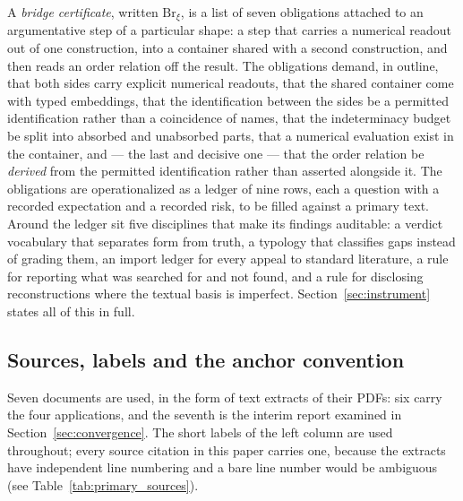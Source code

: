 \documentclass[11pt,a4paper]{article}
\theoremstyle{definition}
\newcommand{\Brxi}{\mathrm{Br}_{\xi}}
\begin{document}
A \emph{bridge certificate}, written $\Brxi$, is a list of seven obligations
attached to an argumentative step of a particular shape: a step that carries a
numerical readout out of one construction, into a container shared with a second
construction, and then reads an order relation off the result. The obligations
demand, in outline, that both sides carry explicit numerical readouts, that the
shared container come with typed embeddings, that the identification between the
sides be a permitted identification rather than a coincidence of names, that the
indeterminacy budget be split into absorbed and unabsorbed parts, that a numerical
evaluation exist in the container, and --- the last and decisive one --- that the
order relation be \emph{derived} from the permitted identification rather than
asserted alongside it. The obligations are operationalized as a ledger of nine
rows, each a question with a recorded expectation and a recorded risk, to be
filled against a primary text. Around the ledger sit five disciplines that make
its findings auditable: a verdict vocabulary that separates form from truth, a
typology that classifies gaps instead of grading them, an import ledger for every
appeal to standard literature, a rule for reporting what was searched for and not
found, and a rule for disclosing reconstructions where the textual basis is
imperfect. Section~\ref{sec:instrument} states all of this in full.

\subsection{Sources, labels and the anchor convention}
\label{sec:sources}

Seven documents are used, in the form of text extracts of their PDFs: six carry the
four applications, and the seventh is the interim report examined in
Section~\ref{sec:convergence}. The short labels of the left column are used
throughout; every source citation in this paper carries one, because the extracts
have independent line numbering and a bare line number would be ambiguous (see Table~\ref{tab:primary_sources}).
\end{document}
